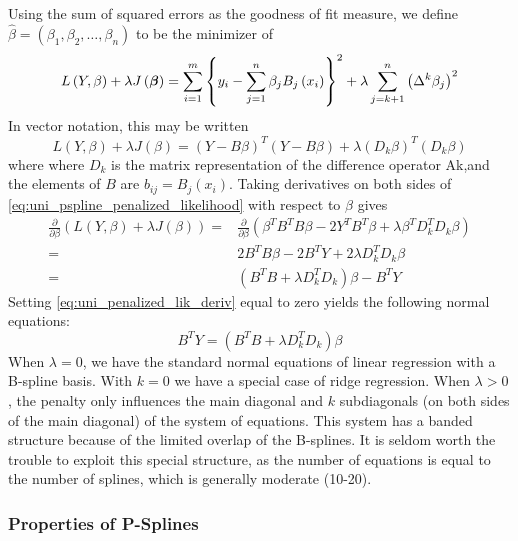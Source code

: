 \documentclass[12pt]{article}
\newcommand*\outlineskeleton{\color{green}}
\newcommand{\bfbeta}{\mbox{\boldmath $\beta$}}
\begin{document}
{Using the sum of squared errors as the goodness of fit measure, we define $\hat{\beta} = \left(\beta_1, \beta_2, \dots, \beta_n \right)$ to be the minimizer of
\begin{equation*}  
L\left(Y, \beta \right) + \lambda J\left(\bfbeta\right) = \sum_{i=1}^m \left\{ y_i - \sum_{j=1}^n \beta_j B_j\left(x_i\right) \right\}^2 + \lambda \sum_{j=k+1}^n \left( \Delta^k\beta_j \right)^2
\end{equation*}
\noindent
In vector notation, this may be written
\begin{equation}\label{eq:uni_pspline_penalized_likelihood}
L\left(Y, \beta \right) + \lambda J\left(\beta\right) = \left( Y- B\beta  \right)^T \left( Y-B \beta\right) + \lambda \left(D_k \beta\right)^T\left(D_k \beta\right)
\end{equation}
\noindent
where where $D_k$ is the matrix representation of the difference operator Ak,and the elements of $B$ are $b_{ij} = B_j\left(x_i\right)$. Taking derivatives on both sides of \ref{eq:uni_pspline_penalized_likelihood} with respect to $\beta$ gives
\begin{align}
\frac{\partial}{\partial \beta}\left(L\left(Y, \beta \right) + \lambda J\left(\beta\right) \right) ={} & \frac{\partial}{\partial \beta}\left(\beta^TB^TB \beta -2Y^T B^T\beta+\lambda \beta^T D_k^T D_k \beta  \right) \nonumber \\
= {} & 2B^TB \beta - 2B^T Y + 2\lambda D_k^TD_k\beta \nonumber\\
= {} & \left(B^T B +  \lambda D_k^TD_k\right)\beta - B^T Y \label{eq:uni_penalized_lik_deriv}
\end{align} 
\noindent
Setting \ref{eq:uni_penalized_lik_deriv} equal to zero yields the following normal equations:
\begin{equation}\label{eq:uni_pspline_normal_eq}
B^T Y = \left(B^T B +  \lambda D_k^TD_k\right)\beta
\end{equation}
When $\lambda = 0$, we have the standard normal equations of linear regression with a B-spline basis. With $k = 0$ we have a special case of ridge regression. When $\lambda > 0$, the penalty only influences the main diagonal and $k$ subdiagonals (on both sides of the main diagonal) of the system of equations. This system has a banded structure because of the limited overlap of the B-splines. It is seldom worth the trouble to exploit this special structure, as the number of equations is equal to the number of splines, which is generally moderate (10-20). 


\subsubsection{{\outlineskeleton Properties of P-Splines}}

}
\end{document}
